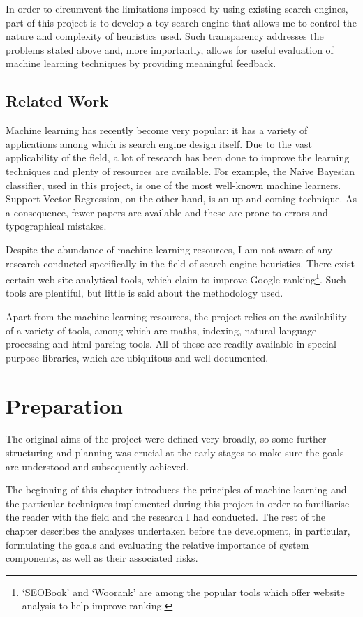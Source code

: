 \documentclass[12pt,notitlepage,twoside]{scrreprt}
\begin{document}
In order to circumvent the limitations imposed by using existing search engines,
part of this project is to develop a toy search engine that allows me to control
the nature and complexity of heuristics used. Such transparency addresses the
problems stated above and, more importantly,  allows for useful evaluation of
machine learning techniques by providing meaningful feedback.

\section{Related Work}
Machine learning has recently become very popular: it has a variety of applications among
which is search engine design itself. Due to the vast applicability of the field, a lot of
research has been done to improve the learning techniques and plenty of resources are
available. For example, the Naive Bayesian classifier, used in this project, is one of the
most well-known machine learners. Support Vector Regression, on the other hand, is an
up-and-coming technique. As a consequence, fewer papers are available and these are prone
to errors and typographical mistakes.

Despite the abundance of machine learning resources, I am not aware of any research
conducted specifically in the field of search engine heuristics. There exist certain web
site analytical tools, which claim to improve Google ranking\footnote{`SEOBook' and
	`Woorank' are among the popular tools which offer website analysis to help improve
ranking.}. Such tools are plentiful, but little is said about the methodology used. 

Apart from the machine learning resources, the project relies on the availability of a variety of
tools, among which are maths, indexing, natural language processing and html parsing tools. All of
these are readily available in special purpose libraries, which are ubiquitous and well
documented.

\chapter{Preparation}
The original aims of the project were defined very broadly, so some further structuring and
planning was crucial at the early stages to make sure the goals are understood and
subsequently achieved.

The beginning of this chapter introduces the principles of machine learning and the
particular techniques implemented during this project in order to familiarise the reader
with the field and the research I had conducted.  The rest of the chapter describes the
analyses undertaken before the development, in particular, formulating the goals and
evaluating the relative importance of system components, as well as their associated
risks. 
\end{document}
